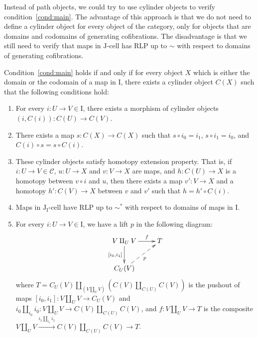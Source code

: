 \documentclass{tac}
\theoremstyle{definition}
\newcommand{\cof}{\mathcal{C}}
\newcommand{\I}{\mathrm{I}}
\newcommand{\J}{\mathrm{J}}
\newcommand{\class}[2]{#1\text{-}\mathrm{#2}}
\newcommand{\Icell}[1][\I]{\class{#1}{cell}}
\newcommand{\Jcell}[1][]{\Icell[\J#1]}
\newcommand{\cyli}{i}
\begin{document}
Instead of path objects, we could try to use cylinder objects to verify condition~\eqref{cond:main}.
The advantage of this approach is that we do not need to define a cylinder object for every object of the category,
only for objects that are domains and codomains of generating cofibrations.
The disadvantage is that we still need to verify that maps in $\Jcell$ has RLP up to $\sim$ with respect to domains of generating cofibrations.

\begin{prop}
Condition~\eqref{cond:main} holds if and only if for every object $X$ which is either the domain or the codomain of a map in $\I$,
there exists a cylinder object $C(X)$ such that the following conditions hold:
\begin{enumerate}
\item For every $i : U \to V \in \I$, there exists a morphism of cylinder objects $(i,C(i)) : C(U) \to C(V)$.
\item There exists a map $s : C(X) \to C(X)$ such that $s \circ i_0 = i_1$, $s \circ i_1 = i_0$, and $C(i) \circ s = s \circ C(i)$.
\item These cylinder objects satisfy homotopy extension property. That is,
if $i : U \to V \in \cof$, $u : U \to X$ and $v : V \to X$ are maps, and $h : C(U) \to X$ is a homotopy between $v \circ i$ and $u$,
then there exists a map $v' : V \to X$ and a homotopy $h' : C(V) \to X$ between $v$ and $v'$ such that $h = h' \circ C(i)$.
\item Maps in $\Jcell[_\I]$ have RLP up to $\sim^*$ with respect to domains of maps in $\I$.
\item For every $i : U \to V \in \I$, we have a lift $p$ in the following diagram:
\[ \xymatrix{ V \amalg_U V \ar[r]^-f \ar[d]_{[\cyli_0,\cyli_1]} & T \\
              C_U(V) \ar@{-->}[ur]_p
            } \]
where $T = C_U(V) \amalg_{(V \amalg_U V)} (C(V) \amalg_{C(U)} C(V))$ is the pushout of maps $[\cyli_0,\cyli_1] : V \amalg_U V \to C_U(V)$
and $\cyli_0 \amalg_{\cyli_0} \cyli_0 : V \amalg_U V \to C(V) \amalg_{C(U)} C(V)$,
and $f : V \amalg_U V \to T$ is the composite $V \amalg_U V \xrightarrow{\cyli_1 \amalg_{\cyli_1} \cyli_1} C(V) \amalg_{C(U)} C(V) \to T$.
\end{enumerate}
\end{prop}
\end{document}
